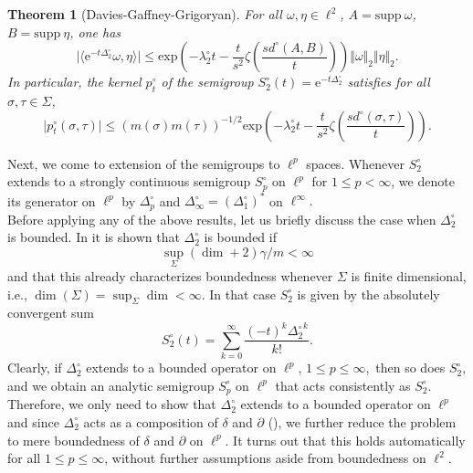 \documentclass[10pt]{amsart}
\newtheorem{theorem}{Theorem}[section]
\theoremstyle{definition}
\begin{document}
\begin{theorem}[Davies-Gaffney-Grigoryan]\label{dggSC}
    For all $\omega,\eta\in\ell^2$, $A=\mathrm{supp}\ \omega$, $B= \mathrm{supp}\ \eta$, one has
    \[\vert\langle\mathrm{e}^{-t \Delta^\circ_2}\omega,\eta\rangle\vert\leq\mathrm{exp}\left(-\lambda_2^\circ t-\frac{t}{s^2}\zeta \left(\frac{s d^\circ(A,B)}{t}\right)\right)\Vert \omega\Vert_2\Vert \eta\Vert_2.\]
    In particular, the kernel $p_t^\circ$ of the semigroup $S_2^\circ(t) = \mathrm{e}^{-t \Delta^\circ_2}$ satisfies for all $\sigma,\tau\in  \Sigma$,
    \[\vert p_t^\circ(\sigma,\tau)\vert\leq (m(\sigma)m(\tau))^{-1\slash 2}\mathrm{exp}\left(-\lambda_2^\circ t-\frac{t}{s^2}\zeta \left(\frac{s d^\circ(\sigma,\tau)}{t}\right)\right).\]
\end{theorem}

Next, we come to extension of the semigroups  to $\ell^p$ spaces. Whenever $S_2^\circ$ extends to a strongly continuous semigroup $S_p^\circ$ on $\ell^p$ for $1\leq p< \infty$, we denote its generator on $\ell^p$ by $\Delta_p^\circ$ and $\Delta_\infty^\circ = (\Delta_1^\circ)^*$ on $\ell^\infty.$ \\
Before applying any of the above results, let us briefly discuss the case when $\Delta^\circ_2$ is bounded. In \cite[Theorem 4.1]{BK} it is shown that $\Delta^\circ_2$ is bounded if \[\sup_{\Sigma}(\dim +2)\gamma\slash m<\infty\] and that this already characterizes boundedness whenever $\Sigma$ is finite dimensional, i.e., $\dim(\Sigma)=\sup_\Sigma\dim<\infty.$ In that case $S^\circ_2$ is given by the absolutely convergent sum
\[S^\circ_2(t) = \sum_{k = 0}^\infty\frac{(-t)^k{\Delta^\circ_2}^k}{k!}.\]
Clearly, if $\Delta^\circ_2$ extends to a bounded operator on $\ell^p$, $1\leq p\leq\infty,$ then so does $S^\circ_2$, and we obtain an analytic semigroup $S^\circ_p$ on $\ell^p$ that acts consistently as $S^\circ_2.$ Therefore, we only need to show that $\Delta^\circ_2$ extends to a bounded operator on $\ell^p$ and since $\Delta^\circ_2$ acts as a composition of $\delta$ and $\partial$ (\cite[Theorem 3.4]{BK}), we further reduce the problem to mere boundedness of $\delta$ and $\partial$ on $\ell^p.$ It turns out that this holds automatically for all $1\leq p\leq\infty$, without further assumptions aside from boundedness on $\ell^2.$
\end{document}
